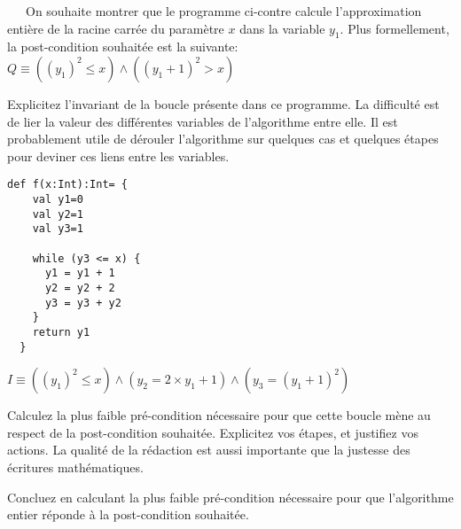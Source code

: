 \documentclass[10pt]{article}\usepackage[nu]{esial}
\begin{document}
\noindent\begin{minipage}{.78\linewidth}
  ~~~On souhaite montrer que le programme ci-contre calcule l'approximation
  entière de la racine carrée du paramètre $x$ dans la variable $y_1$. Plus
  formellement, la post-condition souhaitée est la suivante:
  $Q\equiv\left(\left(y_1\right)^2\leq x\right) \wedge
  \left(\left(y_1+1\right)^2 > x\right)$

  \Question Explicitez l'invariant de la boucle présente dans ce programme. La
  difficulté est de lier la valeur des différentes variables de l'algorithme
  entre elle. Il est probablement utile de dérouler l'algorithme sur quelques
  cas et quelques étapes pour deviner ces liens entre les variables.
\end{minipage}\hfill%
\begin{minipage}{.19\linewidth}
\begin{Verbatim}[gobble=2]
  def f(x:Int):Int= {
    val y1=0
    val y2=1
    val y3=1
    
    while (y3 <= x) {
      y1 = y1 + 1
      y2 = y2 + 2
      y3 = y3 + y2
    }
    return y1
  }
\end{Verbatim}  
\end{minipage}

\begin{Reponse}
  $I\equiv \left(\left(y_1\right)^2\leq x\right) \wedge
           \left(y_2=2\times y_1 + 1\right) \wedge 
           \left(y_3=\left(y_1+1\right)^2\right)$
\end{Reponse}

\Question Calculez la plus faible pré-condition nécessaire pour que cette boucle
mène au respect de la post-condition souhaitée. Explicitez vos étapes, et
justifiez vos actions. La qualité de la rédaction est aussi importante que la
justesse des écritures mathématiques.

\Question Concluez en calculant la plus faible pré-condition nécessaire pour que
l'algorithme entier réponde à la post-condition souhaitée.
\end{document}
